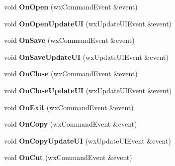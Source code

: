 \begin{DoxyCompactItemize}
\item 
\hypertarget{class_main_frame_aabe1bcb0b9f62cd0f7578456a05099ee}{void {\bfseries On\-Open} (wx\-Command\-Event \&event)}\label{class_main_frame_aabe1bcb0b9f62cd0f7578456a05099ee}

\item 
\hypertarget{class_main_frame_ad81168bd08750269977d4c1d7bd42477}{void {\bfseries On\-Open\-Update\-U\-I} (wx\-Update\-U\-I\-Event \&event)}\label{class_main_frame_ad81168bd08750269977d4c1d7bd42477}

\item 
\hypertarget{class_main_frame_a78af6a47c864028ec8855cdd3f08c027}{void {\bfseries On\-Save} (wx\-Command\-Event \&event)}\label{class_main_frame_a78af6a47c864028ec8855cdd3f08c027}

\item 
\hypertarget{class_main_frame_a5160647848d288c9e750807f6237158a}{void {\bfseries On\-Save\-Update\-U\-I} (wx\-Update\-U\-I\-Event \&event)}\label{class_main_frame_a5160647848d288c9e750807f6237158a}

\item 
\hypertarget{class_main_frame_a22a222bc2e78f162e63113282fe7b008}{void {\bfseries On\-Close} (wx\-Command\-Event \&event)}\label{class_main_frame_a22a222bc2e78f162e63113282fe7b008}

\item 
\hypertarget{class_main_frame_aa5c50eabdeda94f98d2a820022dc5c7d}{void {\bfseries On\-Close\-Update\-U\-I} (wx\-Update\-U\-I\-Event \&event)}\label{class_main_frame_aa5c50eabdeda94f98d2a820022dc5c7d}

\item 
\hypertarget{class_main_frame_af1146ec5200a7421957b143782bca765}{void {\bfseries On\-Exit} (wx\-Command\-Event \&event)}\label{class_main_frame_af1146ec5200a7421957b143782bca765}

\item 
\hypertarget{class_main_frame_a8097107697fc7fa693ab55aa7ea71a8b}{void {\bfseries On\-Copy} (wx\-Command\-Event \&event)}\label{class_main_frame_a8097107697fc7fa693ab55aa7ea71a8b}

\item 
\hypertarget{class_main_frame_a1359735d6cce965dfcaa161cee9e8df8}{void {\bfseries On\-Copy\-Update\-U\-I} (wx\-Update\-U\-I\-Event \&event)}\label{class_main_frame_a1359735d6cce965dfcaa161cee9e8df8}

\item 
\hypertarget{class_main_frame_aeb57051751eb8390a8305766620ca253}{void {\bfseries On\-Cut} (wx\-Command\-Event \&event)}\label{class_main_frame_aeb57051751eb8390a8305766620ca253}


\end{DoxyCompactItemize}
